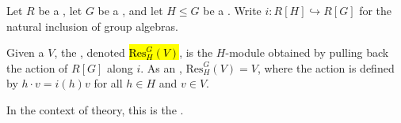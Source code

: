 \begin{definition} \label{definition:restriction_of_a_group_module_over_a_ring_to_a_subgroup}
    Let $R$ be a , let $G$ be a , and let $H \leq G$ be a . Write $i: R[H] \hookrightarrow R[G]$ for the natural inclusion of group algebras.

    Given a  $V$, the , denoted \hl{$\text{Res}^G_H(V)$}, is the $H$-module obtained by pulling back the action of $R[G]$ along $i$. As an , $\text{Res}^G_H(V) = V$, where the action is defined by $h \cdot v = i(h)v$ for all $h \in H$ and $v \in V$. 

    In the context of  theory, this is the .
\end{definition}